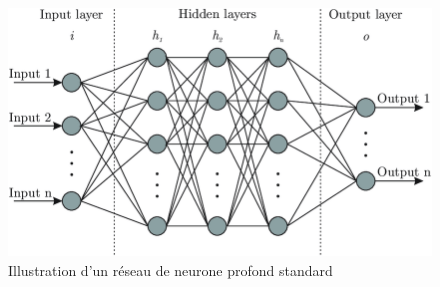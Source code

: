 \documentclass[oneside,a4paper,13pt]{article}
\begin{document}
\begin{figure}[H]
    \centering
    \includegraphics[scale=0.3]{Images/Artificial-neural-network-architecture-ANN-i-h-1-h-2-h-n-o.png}
    \caption{Illustration d'un réseau de neurone profond standard}
    \label{fig:neural_network}
\end{figure}
\end{document}
